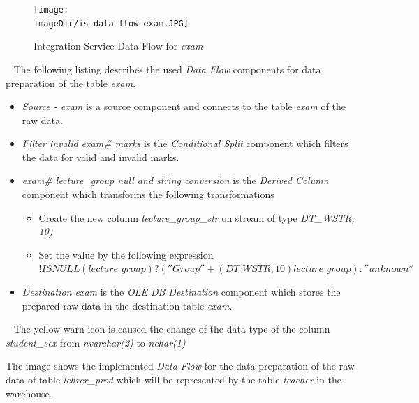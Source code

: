 \documentclass[11pt, a4paper, twoside]{article}   	%
\newcommand{\imageDir}{./images/}
\begin{document}
\begin{figure}[h]
\centering
\texttt{[image: \\imageDir/is-data-flow-exam.JPG]}
\caption{Integration Service Data Flow for \emph{exam}}
\label{fig:is-data-flow-exam}
\end{figure}
\ \newline
The following listing describes the used \emph{Data Flow} components for data preparation of the table \emph{exam}.
\begin{itemize}
	\item \emph{Source - exam} is a source component and connects to the table \emph{exam} of the raw data.
	\item \emph{Filter invalid exam\# marks} is the \emph{Conditional Split} component which filters the data for valid and invalid marks.
	\item \emph{exam\# lecture\_group null and string conversion} is the \emph{Derived Column} component which transforms the following transformations
	\begin{itemize}
		\item Create the new column \emph{lecture\_group\_str} on stream of type \emph{DT\_WSTR, 10)}
		\item Set the value by the following expression 
		\newline
		$!ISNULL(lecture\_group) ? (''Group '' + (DT\_WSTR,10)lecture\_group) : ''unknown''$
	\end{itemize}
	\item \emph{Destination exam} is the \emph{OLE DB Destination} component which stores the prepared raw data in the destination table \emph{exam}.
\end{itemize}
\ \newline
The yellow warn icon is caused the change of the data type of the column \emph{student\_sex} from \emph{nvarchar(2)} to \emph{nchar(1)}
\newpage

The image shows the implemented \emph{Data Flow} for the data preparation of the raw data of table \emph{lehrer\_prod} which will be represented by the table \emph{teacher} in the warehouse.
\end{document}
